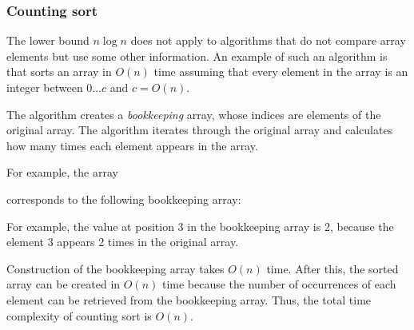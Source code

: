 \subsubsection{Counting sort}


The lower bound $n \log n$ does not apply to
algorithms that do not compare array elements
but use some other information.
An example of such an algorithm is
 that sorts an array in
$O(n)$ time assuming that every element in the array
is an integer between $0 \ldots c$ and $c=O(n)$.

The algorithm creates a \emph{bookkeeping} array,
whose indices are elements of the original array.
The algorithm iterates through the original array
and calculates how many times each element
appears in the array.
\newpage

For example, the array
\begin{center}
\end{center}
corresponds to the following bookkeeping array:
\begin{center}
\end{center}

For example, the value at position 3
in the bookkeeping array is 2,
because the element 3 appears 2 times
in the original array.

Construction of the bookkeeping array
takes $O(n)$ time. After this, the sorted array
can be created in $O(n)$ time because
the number of occurrences of each element can be retrieved
from the bookkeeping array.
Thus, the total time complexity of counting
sort is $O(n)$.

